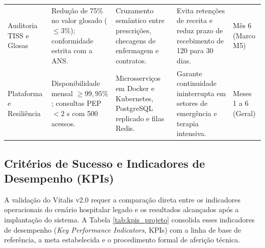 \begin{table}[!htbp]
\begin{tabularx}{\textwidth}{>{\raggedright\arraybackslash}p{2.3cm} >{\raggedright\arraybackslash}p{2.9cm} >{\raggedright\arraybackslash}p{2.9cm} >{\raggedright\arraybackslash}X >{\raggedright\arraybackslash}p{1.8cm}}
\addlinespace
Auditoria TISS e Glosas &
Redução de 75\% no valor glosado ($\le 3\%$); conformidade estrita com a ANS. &
Cruzamento semântico entre prescrições, checagens de enfermagem e contratos. &
Evita retenções de receita e reduz prazo de recebimento de 120 para 30 dias. &
Mês 6 \newline (Marco M5) \\
\addlinespace
Plataforma e Resiliência &
Disponibilidade mensal $\ge 99{,}95\%$; consultas PEP $< 2$ s com 500 acessos. &
Microsserviços em Docker e Kubernetes, PostgreSQL replicado e filas Redis. &
Garante continuidade ininterrupta em setores de emergência e terapia intensiva. &
Meses 1 a 6 \newline (Geral) \\
\bottomrule
\end{tabularx}
\end{table}

\subsection{Critérios de Sucesso e Indicadores de Desempenho (KPIs)}
\label{subsec:criterios_sucesso}

A validação do Vitalis v2.0 requer a comparação direta entre os indicadores operacionais do cenário hospitalar legado e os resultados alcançados após a implantação do sistema. A Tabela \ref{tab:kpis_projeto} consolida esses indicadores de desempenho (\textit{Key Performance Indicators}, KPIs) com a linha de base de referência, a meta estabelecida e o procedimento formal de aferição técnica.

